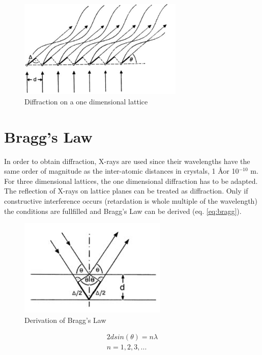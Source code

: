  \begin{figure}[htpb!]
 \centering
 \includegraphics[width=0.7\textwidth]{figures/diffraction.png}
 \caption{Diffraction on a one dimensional lattice \cite{massa}}
 \label{fig:dif}
 \end{figure}
 
 \section{Bragg's Law}
In order to obtain diffraction, X-rays are  used since their wavelengths have the same order of magnitude as the inter-atomic distances in crystals, 1 \AA or 10$^{-10}$ m.  For three dimensional lattices, the one dimensional diffraction has to be adapted. The reflection of X-rays on lattice planes can be treated as diffraction. \cite{bragg} Only if constructive interference occurs (retardation is whole multiple of the wavelength) the conditions are fullfilled and Bragg's Law can  be derived (eq. \ref{eq:bragg}).  


\begin{figure}[htpb!]
\centering
\includegraphics{figures/bragg.png}
\caption{Derivation of Bragg's Law \cite{massa}}
\label{fig:bragg}
\end{figure}


\begin{equation}
\begin{split}
2d sin(\theta) = n\lambda\\
 n=1,2,3,...
\label{eq:bragg}
\end{split}
\end{equation}




